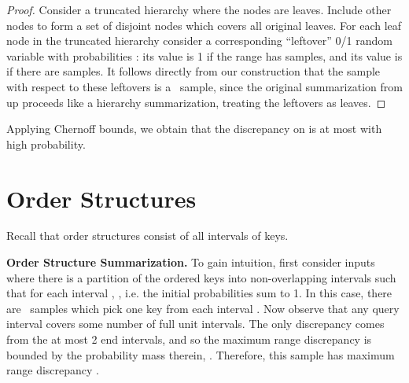 \documentclass[11pt]{article}
\begin{document}
\begin{proof}
Consider a truncated hierarchy where 
the nodes  are leaves.  Include other nodes to form
a set  of disjoint nodes which covers all original leaves.  For
each leaf node in the truncated hierarchy  consider a
corresponding ``leftover'' 0/1 random variable with 
probabilities : 
its value is 1 if the range  has  samples, 
and its value is  if there are
 samples. 
It follows directly from our construction that 
the sample with respect to these leftovers is a \varopt\ sample, since
the original summarization from  up proceeds like a hierarchy
summarization, treating the leftovers as leaves. 
\end{proof}

Applying Chernoff bounds, we obtain that 
the discrepancy on  is at most  with high probability.

\section{Order Structures} \label{ordered:sec}
\noindent
Recall that order structures consist of all intervals of keys.

\noindent
{\bf Order Structure Summarization.}
 To gain intuition, first consider inputs where
there is a partition  of the ordered keys into 
non-overlapping intervals such that for each interval
,  , i.e. the initial
probabilities sum to 1.
In this case, there are \varopt\ samples which pick one key from each 
interval . 
Now observe that any query interval  covers some number
of full unit intervals.
The only discrepancy comes from the at most 2 end intervals, and so
the maximum range discrepancy is bounded by the probability mass
therein,  . 
Therefore, this sample has maximum range discrepancy .  
\end{document}
